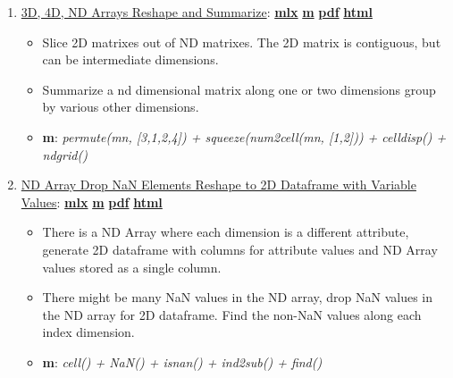 \documentclass[
]{book}
\providecommand{\tightlist}{%
  \setlength{\itemsep}{0pt}\setlength{\parskip}{0pt}}
\begin{document}
\begin{enumerate}
\def\labelenumi{\arabic{enumi}.}
\tightlist
\item
  \href{https://fanwangecon.github.io/M4Econ/amto/arraynd/htmlpdfm/fs_3d4dndarray.html}{3D, 4D, ND Arrays Reshape and Summarize}: \href{https://github.com/FanWangEcon/M4Econ/blob/master/amto/arraynd/fs_3d4dndarray.mlx}{\textbf{mlx}} \textbar{} \href{https://github.com/FanWangEcon/M4Econ/blob/master/amto/arraynd/htmlpdfm/fs_3d4dndarray.m}{\textbf{m}} \textbar{} \href{https://github.com/FanWangEcon/M4Econ/blob/master/amto/arraynd/htmlpdfm/fs_3d4dndarray.pdf}{\textbf{pdf}} \textbar{} \href{https://fanwangecon.github.io/M4Econ/amto/arraynd/htmlpdfm/fs_3d4dndarray.html}{\textbf{html}}

  \begin{itemize}
  \tightlist
  \item
    Slice 2D matrixes out of ND matrixes. The 2D matrix is contiguous, but can be intermediate dimensions.
  \item
    Summarize a nd dimensional matrix along one or two dimensions group by various other dimensions.
  \item
    \textbf{m}: \emph{permute(mn, {[}3,1,2,4{]}) + squeeze(num2cell(mn, {[}1,2{]})) + celldisp() + ndgrid()}
  \end{itemize}
\item
  \href{https://fanwangecon.github.io/M4Econ/amto/arraynd/htmlpdfm/fs_3d4dndarray_nan.html}{ND Array Drop NaN Elements Reshape to 2D Dataframe with Variable Values}: \href{https://github.com/FanWangEcon/M4Econ/blob/master/amto/arraynd/fs_3d4dndarray_nan.mlx}{\textbf{mlx}} \textbar{} \href{https://github.com/FanWangEcon/M4Econ/blob/master/amto/arraynd/htmlpdfm/fs_3d4dndarray_nan.m}{\textbf{m}} \textbar{} \href{https://github.com/FanWangEcon/M4Econ/blob/master/amto/arraynd/htmlpdfm/fs_3d4dndarray_nan.pdf}{\textbf{pdf}} \textbar{} \href{https://fanwangecon.github.io/M4Econ/amto/arraynd/htmlpdfm/fs_3d4dndarray_nan.html}{\textbf{html}}

  \begin{itemize}
  \tightlist
  \item
    There is a ND Array where each dimension is a different attribute, generate 2D dataframe with columns for attribute values and ND Array values stored as a single column.
  \item
    There might be many NaN values in the ND array, drop NaN values in the ND array for 2D dataframe. Find the non-NaN values along each index dimension.
  \item
    \textbf{m}: \emph{cell() + NaN() + isnan() + ind2sub() + find()}
  \end{itemize}
\end{enumerate}
\end{document}
